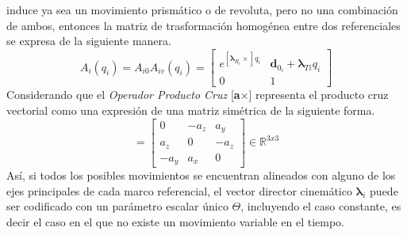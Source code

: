         induce ya sea un movimiento prismático o de revoluta, pero no una combinación de ambos, 
        entonces la matriz de trasformación homogénea entre dos referenciales se 
        expresa de la siguiente manera.
        \begin{equation}
            A_i(q_i) = A_{i0} A_{iv}(q_i) = 
            \begin{bmatrix}
                e^{[\boldsymbol{\lambda}_{R_i}\times]q_i} & \boldsymbol{d}_{0_i} + \boldsymbol{\lambda}_{Ti}q_i\\
                0 & 1
            \end{bmatrix}
            \label{eq:TH_GRYMA}
        \end{equation}
        Considerando que el \emph{Operador Producto Cruz} 
        [\textbf{a}$\times$] representa el producto cruz vectorial como una expresión 
        de una matriz simétrica de la siguiente forma.
        \begin{equation*}
            [\mathbf{a}\times] = 
            \begin{bmatrix}
                0 & -a_z & a_y\\
                a_z & 0 & -a_z\\
                -a_y & a_x & 0
            \end{bmatrix}
            \in \mathbb{R}^{3x3}
        \end{equation*}
        Así, si todos los posibles movimientos se encuentran alineados con alguno de los 
        ejes principales de cada marco referencial, el vector director cinemático $\boldsymbol{\lambda}_i$ 
        puede ser codificado con un parámetro escalar único $\Theta$, incluyendo el caso constante, 
        es decir el caso en el que no existe un movimiento variable en el tiempo.
